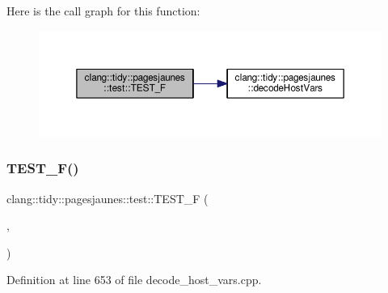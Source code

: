 Here is the call graph for this function\+:
\nopagebreak
\begin{figure}[H]
\begin{center}
\leavevmode
\includegraphics[width=350pt]{namespaceclang_1_1tidy_1_1pagesjaunes_1_1test_ab378b25f1d62bda9ba744b08b654e7c5_cgraph}
\end{center}
\end{figure}
\mbox{\label{namespaceclang_1_1tidy_1_1pagesjaunes_1_1test_ad70912e713fc4ccf969b680167a14ded}} 
\subsubsection{\texorpdfstring{T\+E\+S\+T\+\_\+\+F()}{TEST\_F()}\hspace{0.1cm}{\footnotesize\ttfamily [56/57]}}
{\footnotesize\ttfamily clang\+::tidy\+::pagesjaunes\+::test\+::\+T\+E\+S\+T\+\_\+F (\begin{DoxyParamCaption}\item[{\hyperlink{classclang_1_1tidy_1_1pagesjaunes_1_1test_1_1_decode_host_vars_test}{Decode\+Host\+Vars\+Test}}]{,  }\item[{Decode\+Host\+Vars\+Invalid}]{ }\end{DoxyParamCaption})}



Definition at line 653 of file decode\+\_\+host\+\_\+vars.\+cpp.

